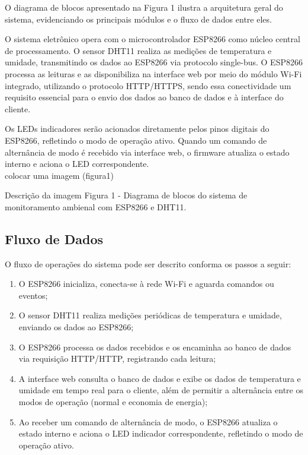 O diagrama de blocos apresentado na Figura 1 ilustra a arquitetura geral do sistema, evidenciando os principais módulos e o fluxo de dados entre eles.

O sistema eletrônico opera com o microcontrolador ESP8266 como núcleo central de processamento. O sensor DHT11 realiza as medições de temperatura e umidade, transmitindo os dados ao ESP8266 via protocolo single-bus. O ESP8266 processa as leituras e as disponibiliza na interface web por meio do módulo Wi-Fi integrado, utilizando o protocolo HTTP/HTTPS, sendo essa conectividade um requisito essencial para o envio dos dados ao banco de dados e à interface do cliente.

Os LEDs indicadores serão acionados diretamente pelos pinos digitais do ESP8266, refletindo o modo de operação ativo. Quando um comando de alternância de modo é recebido via interface web, o firmware atualiza o estado interno e aciona o LED correspondente.\\

colocar uma imagem (figura1)

Descrição da imagem Figura 1 - Diagrama de blocos do sistema de monitoramento ambienal com ESP8266 e DHT11.

\subsection{Fluxo de Dados}

O fluxo de operações do sistema pode ser descrito conforma os passos a seguir:

\begin{enumerate}

    \item O ESP8266 inicializa, conecta-se à rede Wi-Fi e aguarda comandos ou eventos;
    
    \item O sensor DHT11 realiza medições periódicas de temperatura e umidade, enviando os dados ao ESP8266;
    
    \item O ESP8266 processa os dados recebidos e os encaminha ao banco de dados via requisição HTTP/HTTP, registrando cada leitura;

    \item A interface web consulta o banco de dados e exibe os dados de temperatura e umidade em tempo real para o cliente, além de permitir a alternância entre os modos de operação (normal e economia de energia);

    \item Ao receber um comando de alternância de modo, o ESP8266 atualiza o estado interno e aciona o LED indicador correspondente, refletindo o modo de operação ativo. 

\end{enumerate}